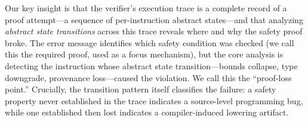 \documentclass[sigplan,10pt,anonymous,review]{acmart}
\begin{document}
Our key insight is that the verifier's execution trace is a complete record of
a proof attempt---a sequence of per-instruction abstract states---and that
analyzing \emph{abstract state transitions} across this trace reveals where
and why the safety proof broke.  The error message identifies which safety
condition was checked (we call this the required proof, used as a focus
mechanism), but the core analysis is detecting the instruction whose abstract
state transition---bounds collapse, type downgrade, provenance loss---caused
the violation.  We call this the ``proof-loss point.''  Crucially, the
transition pattern itself classifies the failure: a safety property never
established in the trace indicates a source-level programming bug, while one
established then lost indicates a compiler-induced lowering artifact.
\end{document}
